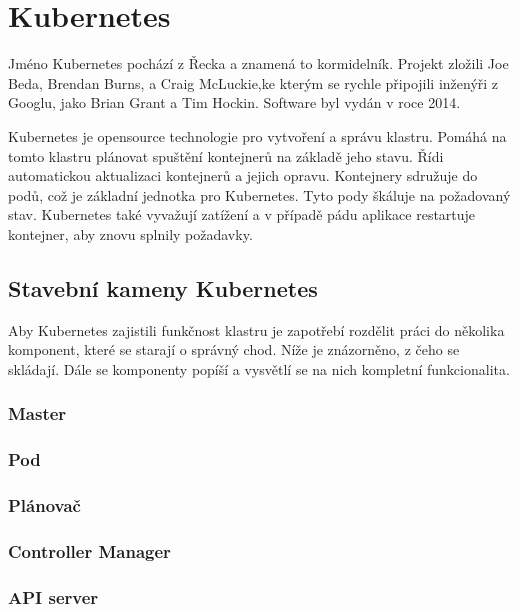 \section{Kubernetes}

Jméno Kubernetes pochází z Řecka a znamená to kormidelník. Projekt zložili Joe Beda, Brendan Burns, a Craig McLuckie,ke kterým se rychle připojili inženýři z Googlu, jako Brian Grant a Tim Hockin. Software byl vydán v roce 2014.

Kubernetes je opensource technologie pro vytvoření a správu klastru. Pomáhá na tomto klastru plánovat spuštění kontejnerů na základě jeho stavu. Řídi automatickou aktualizaci kontejnerů a jejich opravu. Kontejnery sdružuje do podů, což je základní jednotka pro Kubernetes. Tyto pody škáluje na požadovaný stav.
Kubernetes také vyvažují zatížení a v případě pádu aplikace restartuje kontejner, aby znovu splnily požadavky.

\subsection{Stavební kameny Kubernetes}

Aby Kubernetes zajistili funkčnost klastru je zapotřebí rozdělit práci do několika komponent, které se starají o správný chod. Níže je znázorněno, z čeho se skládají. Dále se komponenty popíší a vysvětlí se na nich kompletní funkcionalita. 

\subsubsection{Master}



\subsubsection{Pod}



\subsubsection{Plánovač}



\subsubsection{Controller Manager}



\subsubsection{API server}



